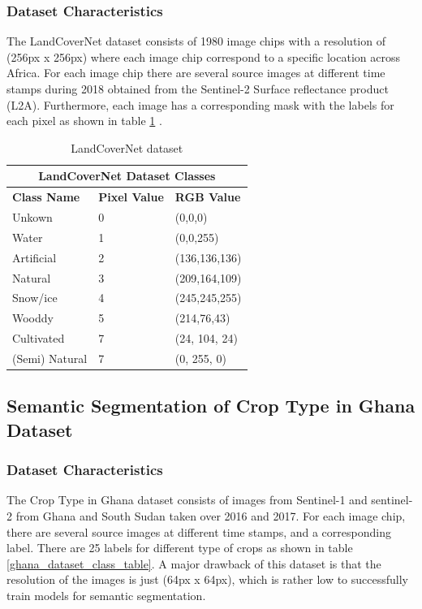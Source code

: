 \documentclass[conference]{IEEEtran}
\begin{document}
\subsubsection{Dataset Characteristics}
The LandCoverNet dataset consists of 1980 image chips with a resolution of (256px x 256px) where each image chip correspond to a specific location across Africa. For each image chip there are several source images at different time stamps during 2018  obtained from the Sentinel-2 Surface reflectance product (L2A). Furthermore, each image has a corresponding mask with the labels for each pixel as shown in table \ref{landcovernet_dataset} \cite{DBLP:journals/corr/abs-2012-03111}. 





\begin{table}[htbp]
\centering
\caption{LandCoverNet dataset}
\begin{tabular}{|p{1.8cm}|p{0.6cm}|p{1.6cm}|}
 \hline
 \multicolumn{3}{|c|}{\textbf{LandCoverNet Dataset Classes}} \\
 \hline
 \textbf{Class Name} & \textbf{Pixel Value}& \textbf{RGB Value} \\
 \hline
 Unkown & 0  & (0,0,0)\\ 
 \hline
 Water & 1  & (0,0,255)\\ 
 \hline
 Artificial & 2  & (136,136,136)\\ 
 \hline
 Natural & 3  & (209,164,109)\\ 
 \hline
 Snow/ice & 4 &  (245,245,255)\\ 
 \hline
 Wooddy & 5  & (214,76,43)\\ 
 \hline
 Cultivated & 7  & (24, 104, 24)\\ 
 \hline
 (Semi) Natural & 7  & (0, 255, 0)\\ 
 \hline
\end{tabular}
\label{landcovernet_dataset}
\end{table}

\subsection{Semantic Segmentation of Crop Type in Ghana Dataset}
\subsubsection{Dataset Characteristics}
The Crop Type in Ghana dataset \cite{Rustowicz2019SemanticSO} consists of images from Sentinel-1 and sentinel-2 from Ghana and South Sudan taken over 2016 and 2017. For each image chip, there are several source images at different time stamps, and a corresponding label. There are 25 labels for different type of crops as shown in table \ref{ghana_dataset_class_table}. A major drawback of this dataset is that the resolution of the images is just (64px x 64px), which is rather low to successfully train models for semantic segmentation. 
\end{document}
